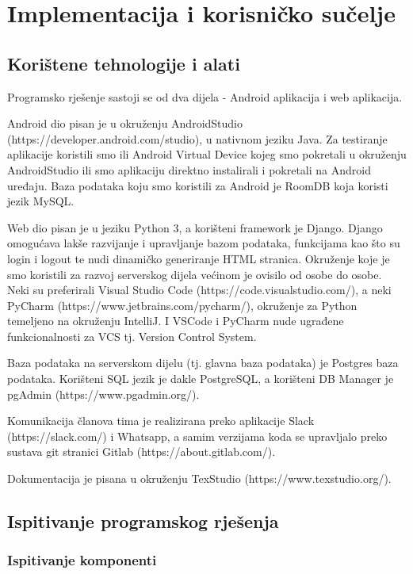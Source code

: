 \chapter{Implementacija i korisničko sučelje}
	\section{Korištene tehnologije i alati}
		Programsko rješenje sastoji se od dva dijela - Android aplikacija i web aplikacija.
		
		Android dio pisan je u okruženju AndroidStudio (https://developer.android.com/studio), u nativnom jeziku Java. Za testiranje aplikacije koristili smo ili Android Virtual Device kojeg smo pokretali u okruženju AndroidStudio ili smo aplikaciju direktno instalirali i pokretali na Android uređaju. Baza podataka koju smo koristili za Android je RoomDB koja koristi jezik MySQL.
		
		Web dio pisan je u jeziku Python 3, a korišteni framework je Django. Django omogućava lakše razvijanje i upravljanje bazom podataka, funkcijama kao što su login i logout te nudi dinamičko generiranje HTML stranica. Okruženje koje je smo koristili za razvoj serverskog dijela većinom je ovisilo od osobe do osobe. Neki su preferirali Visual Studio Code (https://code.visualstudio.com/), a neki PyCharm (https://www.jetbrains.com/pycharm/), okruženje za Python temeljeno na okruženju IntelliJ. I VSCode i PyCharm nude ugrađene funkcionalnosti za VCS tj. Version Control System.
		
		Baza podataka na serverskom dijelu (tj. glavna baza podataka) je Postgres baza podataka. Korišteni SQL jezik je dakle PostgreSQL, a korišteni DB Manager je pgAdmin (https://www.pgadmin.org/).
		
		Komunikacija članova tima je realizirana preko aplikacije Slack (https://slack.com/) i Whatsapp, a samim verzijama koda se upravljalo preko sustava git stranici Gitlab (https://about.gitlab.com/).
		
		Dokumentacija je pisana u okruženju TexStudio (https://www.texstudio.org/).
		
		
		
		
		\eject
	\section{Ispitivanje programskog rješenja}
		\subsection{Ispitivanje komponenti}
			
